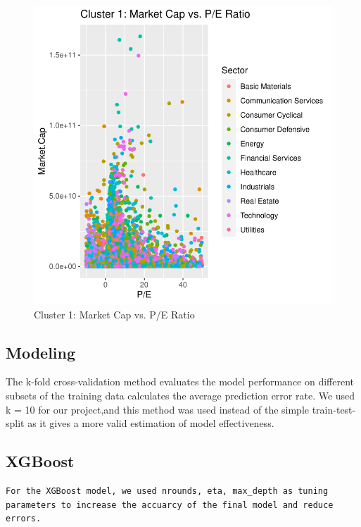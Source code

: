 \documentclass[11pt,]{article}
\begin{document}
\begin{figure}

{\centering \includegraphics{stock_analysis_files/figure-latex/pe ratio clust1-1} 

}

\caption{Cluster 1: Market Cap vs. P/E Ratio}\label{fig:pe ratio clust1}
\end{figure}

\hypertarget{modeling}{%
\subsection{Modeling}\label{modeling}}

The k-fold cross-validation method evaluates the model performance on
different subsets of the training data calculates the average prediction
error rate. We used k = 10 for our project,and this method was used
instead of the simple train-test-split as it gives a more valid
estimation of model effectiveness.

\hypertarget{xgboost}{%
\subsection{XGBoost}\label{xgboost}}

\begin{verbatim}
For the XGBoost model, we used nrounds, eta, max_depth as tuning parameters to increase the accuarcy of the final model and reduce errors.
\end{verbatim}
\end{document}
